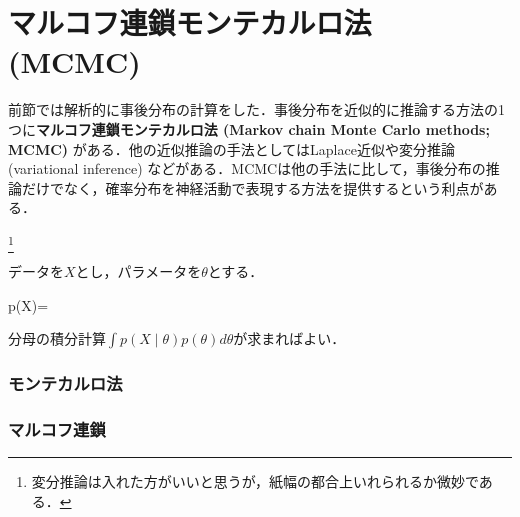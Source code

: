 \section{マルコフ連鎖モンテカルロ法 (MCMC)}
前節では解析的に事後分布の計算をした．事後分布を近似的に推論する方法の1つに\textbf{マルコフ連鎖モンテカルロ法 (Markov chain Monte Carlo methods; MCMC)} がある．他の近似推論の手法としてはLaplace近似や変分推論 (variational inference) などがある．MCMCは他の手法に比して，事後分布の推論だけでなく，確率分布を神経活動で表現する方法を提供するという利点がある．

\footnote{
変分推論は入れた方がいいと思うが，紙幅の都合上いれられるか微妙である．
}

データを$X$とし，パラメータを$\theta$とする．


p(\theta\mid X)=


分母の積分計算$\int p(X\mid \theta)p(\theta)d\theta$が求まればよい．

\subsubsection{モンテカルロ法}

\subsubsection{マルコフ連鎖}

